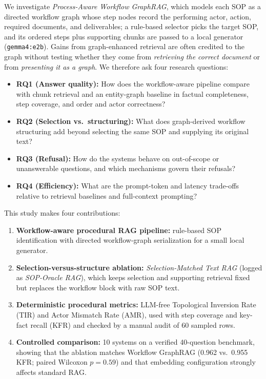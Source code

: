 \documentclass[preprint,10pt]{elsarticle}
\begin{document}
We investigate \emph{Process-Aware Workflow GraphRAG}, which models each SOP as a directed workflow graph \cite{dumas2018fundamentals} whose step nodes record the performing actor, action, required documents, and deliverables; a rule-based selector picks the target SOP, and its ordered steps plus supporting chunks are passed to a local generator (\texttt{gemma4:e2b}). Gains from graph-enhanced retrieval are often credited to the graph without testing whether they come from \emph{retrieving the correct document} or from \emph{presenting it as a graph}. We therefore ask four research questions:
\begin{itemize}[leftmargin=*]
\item \textbf{RQ1 (Answer quality):} How does the workflow-aware pipeline compare with chunk retrieval and an entity-graph baseline in factual completeness, step coverage, and order and actor correctness?
\item \textbf{RQ2 (Selection vs.\ structuring):} What does graph-derived workflow structuring add beyond selecting the same SOP and supplying its original text?
\item \textbf{RQ3 (Refusal):} How do the systems behave on out-of-scope or unanswerable questions, and which mechanisms govern their refusals?
\item \textbf{RQ4 (Efficiency):} What are the prompt-token and latency trade-offs relative to retrieval baselines and full-context prompting?
\end{itemize}

This study makes four contributions:
\begin{enumerate}[leftmargin=*]
\item \textbf{Workflow-aware procedural RAG pipeline:} rule-based SOP identification with directed workflow-graph serialization for a small local generator.
\item \textbf{Selection-versus-structure ablation:} \emph{Selection-Matched Text RAG} (logged as \emph{SOP-Oracle RAG}), which keeps selection and supporting retrieval fixed but replaces the workflow block with raw SOP text.
\item \textbf{Deterministic procedural metrics:} LLM-free Topological Inversion Rate (TIR) and Actor Mismatch Rate (AMR), used with step coverage and key-fact recall (KFR) and checked by a manual audit of 60 sampled rows.
\item \textbf{Controlled comparison:} 10 systems on a verified 40-question benchmark, showing that the ablation matches Workflow GraphRAG (0.962 vs.\ 0.955 KFR; paired Wilcoxon $p=0.59$) and that embedding configuration strongly affects standard RAG.
\end{enumerate}
\end{document}

